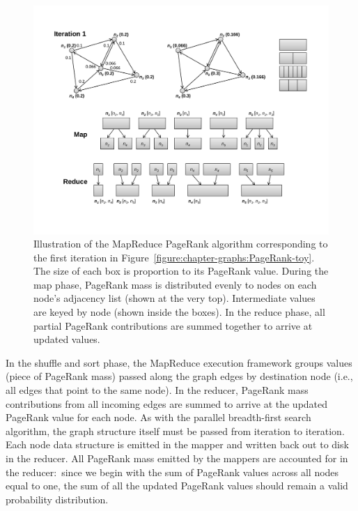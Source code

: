 \begin{figure}[t]
\begin{center}
\vspace{0.2cm}
\includegraphics[scale=0.6]{figures/fig-ch5-MapReduce-example.pdf}
\vspace{-0.3cm}
\end{center}
\caption{Illustration of the MapReduce PageRank algorithm
  corresponding to the first iteration in
  Figure~\ref{figure:chapter-graphs:PageRank-toy}.  The size of each
  box is proportion to its PageRank value.  During the map phase,
  PageRank mass is distributed evenly to nodes on each node's
  adjacency list (shown at the very top).  Intermediate values are
  keyed by node (shown inside the boxes).  In the reduce phase, all
  partial PageRank contributions are summed together to arrive at
  updated values.}
\label{figure:chapter-graphs:PageRank-MapReduce-example}
\end{figure}

In the shuffle and sort phase, the MapReduce execution framework
groups values (piece of PageRank mass) passed along the graph edges by
destination node (i.e., all edges that point to the same node).  In
the reducer, PageRank mass contributions from all incoming edges are
summed to arrive at the updated PageRank value for each node.  As with
the parallel breadth-first search algorithm, the graph structure
itself must be passed from iteration to iteration.  Each node data
structure is emitted in the mapper and written back out to disk in the
reducer.  All PageRank mass emitted by the mappers are accounted for
in the reducer:\ since we begin with the sum of PageRank values across
all nodes equal to one, the sum of all the updated PageRank values
should remain a valid probability distribution.

